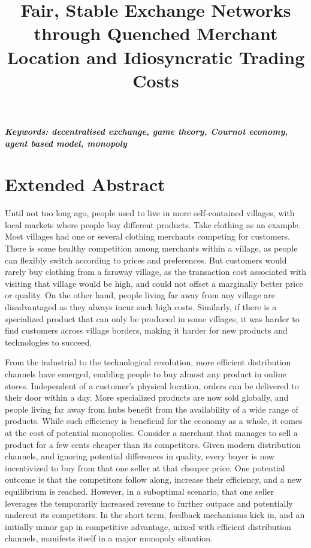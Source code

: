 \documentclass[a4paper,12pt]{article}
\title{Fair, Stable Exchange Networks through Quenched Merchant Location and Idiosyncratic Trading Costs}
\author[]{} %
\date{}
\begin{document}
\maketitle
\thispagestyle{fancy}

\vspace{-6em}
\begin{center}
\textbf{\textit{Keywords: decentralised exchange, game theory, Cournot economy, agent based model, monopoly}} 
\newline
\end{center}

\section*{Extended Abstract}

Until not too long ago, people used to live in more self-contained villages, with local markets where people buy different products. 
Take clothing as an example. Most villages had one or several clothing merchants competing for customers. 
There is some healthy competition among merchants within a village, as people can flexibly switch according to prices and preferences.
But customers would rarely buy clothing from a faraway village, as the transaction cost associated with visiting that village would be high, 
and could not offset a marginally better price or quality. 
On the other hand, people living far away from any village are disadvantaged as they always incur such high costs.
Similarly, if there is a specialized product that can only be produced in some villages, it was harder to find customers across village borders, 
making it harder for new products and technologies to succeed. 

From the industrial to the technological revolution, more efficient distribution channels have emerged, enabling people to buy almost any product in online stores. 
Independent of a customer's physical location, orders can be delivered to their door within a day. 
More specialized products are now sold globally, and people living far away from hubs benefit from the availability of a wide range of products. 
While such efficiency is beneficial for the economy as a whole, it comes at the cost of potential monopolies. 
Consider a merchant that manages to sell a product for a few cents cheaper than its competitors. 
Given modern distribution channels, and ignoring potential differences in quality, every buyer is now incentivized to buy from that one seller at that cheaper price.
One potential outcome is that the competitors follow along, increase their efficiency, and a new equilibrium is reached. 
However, in a suboptimal scenario, that one seller leverages the temporarily increased revenue to further outpace and potentially undercut its competitors. 
In the short term, feedback mechanisms kick in, and an initially minor gap in competitive advantage, mixed with efficient distribution channels, manifests itself in a major monopoly situation. 
\end{document}
